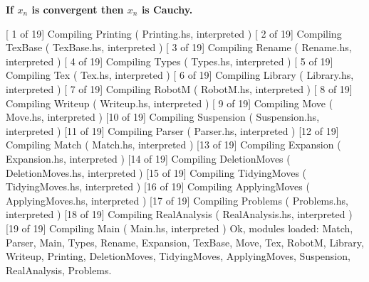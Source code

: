 \documentclass[a4paper,twoside,12pt]{article} %
\makeatletter
\DeclareRobustCommand{\_}{%
  \leavevmode\vbox{%
    \hrule\@width.4em
          \@height-.16ex
          \@depth\dimexpr.16ex+.28pt\relax}}
\makeatother
\begin{document}
{\begin{center} \large \textbf{If $x_n$ is convergent then $x_n$ is Cauchy.}\end{center}}\nopagebreak[4]

[ 1 of 19] Compiling Printing         ( Printing.hs, interpreted )
[ 2 of 19] Compiling TexBase          ( TexBase.hs, interpreted )
[ 3 of 19] Compiling Rename           ( Rename.hs, interpreted )
[ 4 of 19] Compiling Types            ( Types.hs, interpreted )
[ 5 of 19] Compiling Tex              ( Tex.hs, interpreted )
[ 6 of 19] Compiling Library          ( Library.hs, interpreted )
[ 7 of 19] Compiling RobotM           ( RobotM.hs, interpreted )
[ 8 of 19] Compiling Writeup          ( Writeup.hs, interpreted )
[ 9 of 19] Compiling Move             ( Move.hs, interpreted )
[10 of 19] Compiling Suspension       ( Suspension.hs, interpreted )
[11 of 19] Compiling Parser           ( Parser.hs, interpreted )
[12 of 19] Compiling Match            ( Match.hs, interpreted )
[13 of 19] Compiling Expansion        ( Expansion.hs, interpreted )
[14 of 19] Compiling DeletionMoves    ( DeletionMoves.hs, interpreted )
[15 of 19] Compiling TidyingMoves     ( TidyingMoves.hs, interpreted )
[16 of 19] Compiling ApplyingMoves    ( ApplyingMoves.hs, interpreted )
[17 of 19] Compiling Problems         ( Problems.hs, interpreted )
[18 of 19] Compiling RealAnalysis     ( RealAnalysis.hs, interpreted )
[19 of 19] Compiling Main             ( Main.hs, interpreted )
Ok, modules loaded: Match, Parser, Main, Types, Rename, Expansion, TexBase, Move, Tex, RobotM, Library, Writeup, Printing, DeletionMoves, TidyingMoves, ApplyingMoves, Suspension, RealAnalysis, Problems.
\end{document}
